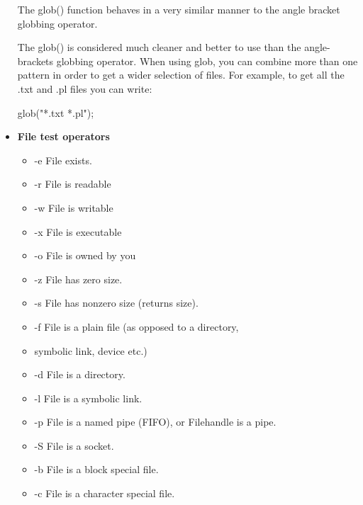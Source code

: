 \documentclass{report}
\begin{document}
\begin{itemize}
            \bigbreak \noindent 
            The glob() function behaves in a very similar manner to the angle bracket globbing operator.
            \bigbreak \noindent
            \bigbreak \noindent 
            The glob() is considered much cleaner and better to use than the angle-brackets globbing operator.
            \bigbreak \noindent 
            When using glob, you can combine more than one pattern in order to get a wider selection of files. For example, to get all the .txt and .pl files you can write:
            \bigbreak \noindent 
            \begin{perlcode}
            glob("*.txt *.pl");
            \end{perlcode}
        \item \textbf{File test operators}
            \begin{itemize}
                \item -e File exists.
                \item -r File is readable
                \item -w File is writable
                \item -x File is executable
                \item -o File is owned by you
                \item -z File has zero size.
                \item -s File has nonzero size (returns size).
                \item -f File is a plain file (as opposed to a directory,
                \item symbolic link, device etc.)
                \item -d File is a directory.
                \item -l File is a symbolic link.
                \item -p File is a named pipe (FIFO), or Filehandle is a pipe.
                \item -S File is a socket.
                \item -b File is a block special file.
                \item -c File is a character special file.

\end{itemize}
\end{itemize}
\end{document}
